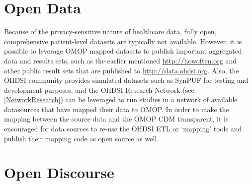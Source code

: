 \documentclass[11pt]{book}
\theoremstyle{definition}
\theoremstyle{definition}
\theoremstyle{definition}
\theoremstyle{remark}
\begin{document}
\section{Open Data}\label{open-data}


Because of the privacy-sensitive nature of healthcare data, fully open,
comprehensive patient-level datasets are typically not available.
However, it is possible to leverage OMOP mapped datasets to publish
important aggregated data and results sets, such as the earlier
mentioned \url{http://howoften.org} and other public result sets that
are published to \url{http://data.ohdsi.org}. Also, the OHDSI community
provides simulated datasets such as SynPUF for testing and development
purposes, and the OHDSI Research Network (see \ref{NetworkResearch}) can
be leveraged to run studies in a network of available datasources that
have mapped their data to OMOP. In order to make the mapping between the
source data and the OMOP CDM transparent, it is encouraged for data
sources to re-use the OHDSI ETL or `mapping' tools and publish their
mapping code as open source as well.

\section{Open Discourse}\label{open-discourse}

\end{document}
